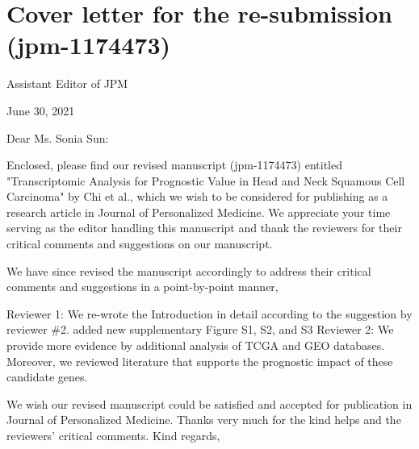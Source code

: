 \documentclass[preprint,12pt]{elsarticle}
\begin{document}
\section*{Cover letter for the re-submission (jpm-1174473)} 
 


Assistant Editor of JPM%

June 30, 2021

Dear Ms. Sonia Sun:

Enclosed, please find our revised manuscript (jpm-1174473) entitled "Transcriptomic Analysis for Prognostic Value in Head and Neck Squamous Cell Carcinoma" by Chi et al., which we wish to be considered for publishing as a research article in Journal of Personalized Medicine. We appreciate your time serving as the editor handling this manuscript and thank the reviewers for their critical comments and suggestions on our manuscript.

We have since revised the manuscript accordingly to address their critical comments and suggestions in a point-by-point manner, 


Reviewer 1: %
We re-wrote the Introduction in detail according to the suggestion by reviewer \#2.
added new supplementary Figure S1, S2, and S3
Reviewer 2: %
We provide more evidence by additional analysis of TCGA and GEO databases. Moreover, we reviewed literature that supports the prognostic impact of these candidate genes.

We wish our revised manuscript could be satisfied and accepted for publication in Journal of Personalized Medicine. 
Thanks very much for the kind helps and the reviewers' critical comments.
Kind regards,
\end{document}
